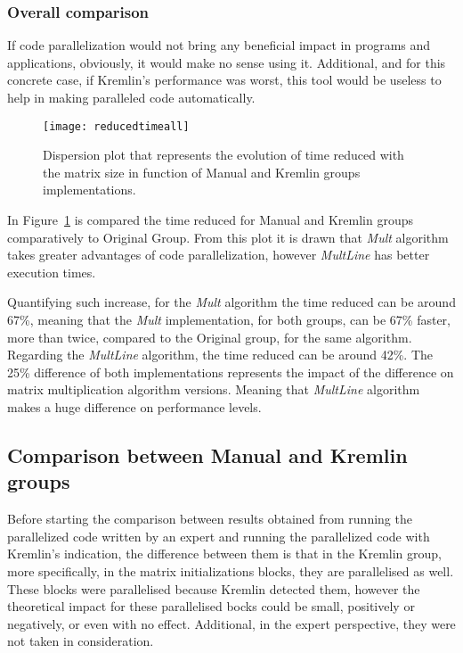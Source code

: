 \subsubsection{Overall comparison}\label{subsubsec:overall}

If code parallelization would not bring any beneficial impact in programs and applications, obviously, it would make no sense using it. Additional, and for this concrete case, if Kremlin's performance was worst, this tool would be useless to help in making paralleled code automatically.


\begin{figure}[htb]
	\begin{center}
		\leavevmode
		\texttt{[image: reducedtimeall]}
		\caption{Dispersion plot that represents the evolution of time reduced with the matrix size in function of Manual and Kremlin groups implementations.}
		\label{fig:reducedtimeall}
	\end{center}
\end{figure}

In Figure~\ref{fig:reducedtimeall} is compared the time reduced for Manual and Kremlin groups comparatively to Original Group. From this plot it is drawn that \textit{Mult} algorithm takes greater advantages of code parallelization, however \textit{MultLine} has better execution times. 

Quantifying such increase, for the \textit{Mult} algorithm  the time reduced can be around 67\%, meaning that the \textit{Mult} implementation, for both groups, can be 67\% faster, more than twice, compared to the Original group, for the same algorithm.
Regarding the \textit{MultLine} algorithm, the time reduced can be around 42\%. The 25\% difference of both implementations represents the impact of the difference on matrix multiplication algorithm versions. Meaning that \textit{MultLine} algorithm makes a huge difference on performance levels.



\subsection{Comparison between Manual and Kremlin groups}

Before starting the comparison between results obtained from running the parallelized code written by an expert and running the parallelized code with Kremlin's indication, the difference between them is that in the Kremlin group, more specifically, in the matrix initializations blocks, they are parallelised as well. These blocks were parallelised because Kremlin detected them, however the theoretical impact for these parallelised bocks could be small, positively or negatively, or even with no effect. Additional, in the expert perspective, they were not taken in consideration.

